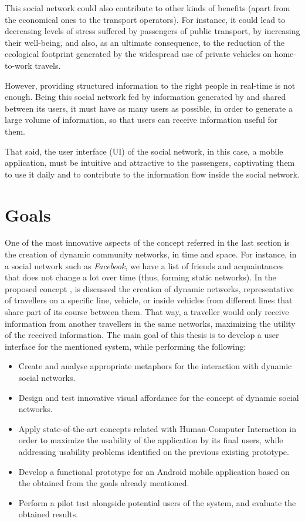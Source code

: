 This social network could also contribute to other kinds of benefits (apart from the economical ones to the transport operators). For instance, it could lead to decreasing levels of stress suffered by passengers of public transport, by increasing their well-being, and also, as an ultimate consequence, to the reduction of the ecological footprint generated by the widespread use of private vehicles on home-to-work travels.

However, providing structured information to the right people in real-time is not enough. Being this social network fed by information generated by and shared between its users, it must have as many users as possible, in order to generate a large volume of information, so that users can receive information useful for them.

That said, the user interface (UI) of the social network, in this case, a mobile application, must be intuitive and attractive to the passengers, captivating them to use it daily and to contribute to the information flow inside the social network. 

\section{Goals} \label{sec:goals}

One of the most innovative aspects of the concept referred in the last section is the creation of dynamic community networks, in time and space. For instance, in a social network such as \emph{Facebook}, we have a list of friends and acquaintances that does not change a lot over time (thus, forming static networks). In the proposed concept \cite{kn:NGeCP11}, is discussed the creation of dynamic networks, representative of travellers on a specific line, vehicle, or inside vehicles from different lines that share part of its course between them. That way, a traveller would only receive information from another travellers in the same networks, maximizing the utility of the received information.
The main goal of this thesis is to develop a user interface for the mentioned system, while performing the following:

\begin{itemize}
\item Create and analyse appropriate metaphors for the interaction with dynamic social networks.
\item Design and test innovative visual affordance for the concept of dynamic social networks.
\item Apply state-of-the-art concepts related with Human-Computer Interaction in order to maximize the usability of the application by its final users, while addressing usability problems identified on the previous existing prototype.
\item Develop a functional prototype for an Android mobile application based on the obtained from the goals already mentioned.
\item Perform a pilot test alongside potential users of the system, and evaluate the obtained results.
\end{itemize}


